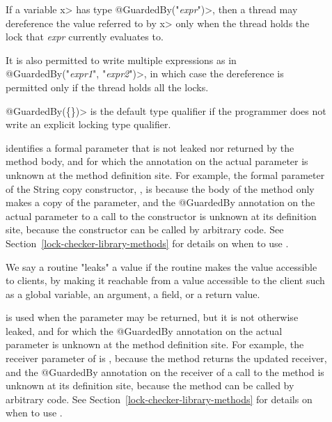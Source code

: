 \begin{description}

\item[]
  If a variable \<x> has type \<@GuardedBy("\emph{expr}")>, then a thread may
  dereference the value referred to by \<x> only when the thread holds the
  lock that \emph{expr} currently evaluates to.

  It is also permitted to write multiple expressions as in
  \<@GuardedBy(\ttlcb"\emph{expr1}", "\emph{expr2}"\ttrcb)>, in which case
  the dereference is
  permitted only if the thread holds all the locks.

  \<@GuardedBy(\{\})> is the default type qualifier if the programmer does not
  write an explicit locking type qualifier.

\item[]
  identifies a formal parameter that is not leaked nor
  returned by the method body, and for which the  annotation
  on the actual parameter is unknown at the method definition site.
  For example, the formal parameter of the String copy constructor,
  , is  because the body of the method
  only makes a copy of the parameter, and the @GuardedBy annotation
  on the actual parameter to a call to the constructor is unknown
  at its definition site, because the constructor can be called by
  arbitrary code.  See Section~\ref{lock-checker-library-methods}
  for details on when to use .

  We say a routine "leaks" a value if the routine makes the value accessible
  to clients, by making it reachable from a value accessible to the client
  such as a global variable, an argument, a field, or a return value.

\item[]
  is used when the parameter may be returned, but it is not
  otherwise leaked, and for which the @GuardedBy annotation
  on the actual parameter is unknown at the method definition site.
  For example, the receiver parameter of  is
  , because the method returns the updated receiver,
  and the @GuardedBy annotation
  on the receiver of a call to the method is unknown
  at its definition site, because the method can be called by
  arbitrary code.  See Section~\ref{lock-checker-library-methods}
  for details on when to use .


\end{description}
